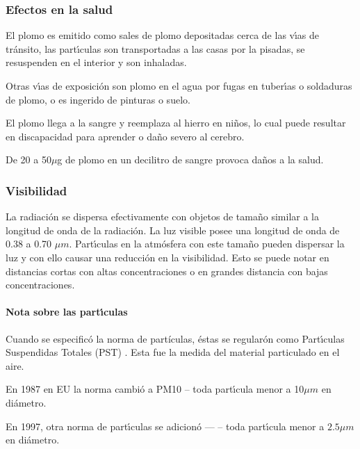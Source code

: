 \subsubsection{Efectos en la salud}
El plomo es emitido como sales de plomo depositadas cerca de las v\'{\i}as de tr\'ansito, las
part\'{\i}culas son transportadas a las casas por la pisadas, se resuspenden en el
interior y son inhaladas.

Otras v\'{\i}as de exposici\'on son plomo en el agua por fugas en tuber\'{\i}as o
soldaduras de plomo,  o es ingerido de pinturas o suelo.

El plomo llega a la sangre y reemplaza al hierro en ni\~nos, lo cual puede resultar en
discapacidad para aprender o da\~no severo al cerebro.

De 20 a 50$\mu$g de plomo en un decilitro de sangre provoca da\~nos a la salud.

\subsubsection{Visibilidad}

La radiaci\'on se dispersa efectivamente con objetos de tama\~no similar a la longitud
de onda de la radiaci\'on. La luz visible posee una longitud de onda de 0.38 a 0.70
$\mu m$. Part\'{\i}culas en la atm\'osfera con este tama\~no pueden dispersar la luz y
con ello causar una reducci\'on en la visibilidad. Esto se puede notar en distancias
cortas con altas concentraciones o en grandes distancia con bajas concentraciones.
\paragraph{Nota sobre las part\'{\i}culas}
Cuando se especific\'o la norma de partículas, \'estas se regular\'on como Part\'{\i}culas Suspendidas Totales (PST) . Esta fue la medida del material particulado en el aire.

En 1987 en EU la norma cambi\'o a PM10 -- toda part\'{\i}cula menor a 10$\mu m$ en di\'ametro.

En 1997, otra norma de part\'{\i}culas se adicion\'o ---  -- toda part\'{\i}cula menor a $2.5\mu m$ en di\'ametro.


